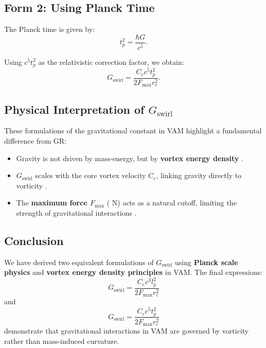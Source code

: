 \subsection*{Form 2: Using Planck Time}
The Planck time is given by:
\begin{equation*}
    t_p^2 = \frac{\hbar G}{c^5}.
\end{equation*}

Using \( c^5 t_p^2 \) as the relativistic correction factor, we obtain:
\begin{equation*}
    G_\text{swirl} = \frac{C_e c^5 t_p^2}{2 F_{\max} r_c^2}.
\end{equation*}

\subsection*{Physical Interpretation of \(  G_\text{swirl} \)}
These formulations of the gravitational constant in VAM highlight a fundamental difference from GR:
\begin{itemize}
    \item Gravity is not driven by mass-energy, but by \textbf{vortex energy density} \cite{barcelo_superfluid}.
    \item \(  G_\text{swirl} \) scales with the core vortex velocity \( C_e \), linking gravity directly to vorticity \cite{moffatt_helicity}.
    \item The \textbf{maximum force \( F_{\max} \)} ( N) acts as a natural cutoff, limiting the strength of gravitational interactions \cite{schiller_max_force}.
\end{itemize}

\subsection*{Conclusion}
We have derived two equivalent formulations of \(  G_\text{swirl} \) using \textbf{Planck scale physics} and \textbf{vortex energy density principles} in VAM. The final expressions:
\begin{equation*}
    G_\text{swirl} = \frac{C_e c^3 l_p^2}{2 F_{\max} r_c^2}
\end{equation*}
and
\begin{equation*}
    G_\text{swirl} = \frac{C_e c^5 t_p^2}{2 F_{\max} r_c^2}
\end{equation*}
demonstrate that gravitational interactions in VAM are governed by vorticity rather than mass-induced curvature.



